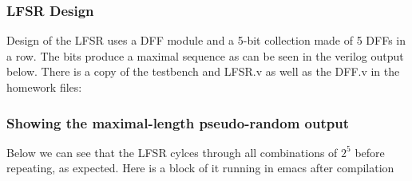 \documentclass[a4paper,11pt]{exam}
\begin{document}
\subsubsection{LFSR Design}
\label{sec:org628d953}
Design of the LFSR uses a DFF module and a 5-bit collection made of 5 DFFs in a row. The bits produce a maximal sequence as can be seen in the verilog output below. There is a copy of the testbench and LFSR.v as well as the DFF.v in the homework files:
\subsubsection{Showing the maximal-length pseudo-random output}
\label{sec:orgf8c5872}
Below we can see that the LFSR cylces through all combinations of \(2^5\) before repeating, as expected. Here is a block of it running in emacs after compilation
\end{document}
